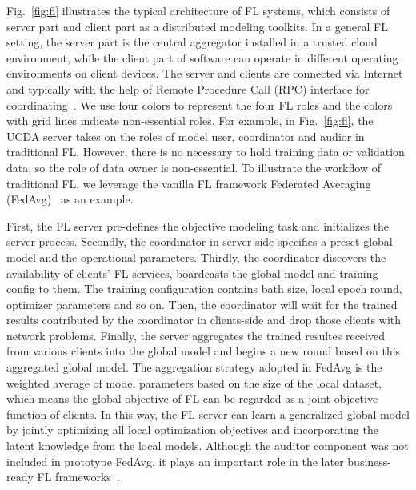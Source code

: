 Fig.~\ref{fig:fl} illustrates the typical architecture of FL systems, which consists of server part and client part as a distributed modeling toolkits. 
In a general FL setting, the server part is the central aggregator installed in a trusted cloud environment, while the client part of software can operate in different operating environments on client devices. 
The server and clients are connected via Internet and typically with the help of Remote Procedure Call (RPC) interface for coordinating~\cite{zhang2022felicitas, abadi2016tensorflow, liu2021fate, beutel2020flower, he2020fedml, foley2022openfl}.
We use four colors to represent the four FL roles and the colors with grid lines indicate non-essential roles.
For example, in Fig.~\ref{fig:fl}, the UCDA server takes on the roles of model user, coordinator and audior in traditional FL. 
However, there is no necessary to hold training data or validation data, so the role of data owner is non-essential.
To illustrate the workflow of traditional FL, we leverage the vanilla FL framework Federated Averaging (FedAvg)~\cite{mcmahan2017communication, bonawitz2019towards} as an example.

First, the FL server pre-defines the objective modeling task and initializes the server process.
Secondly,  the coordinator in server-side specifies a preset global model and the operational parameters.
Thirdly, the coordinator discovers the availability of clients' FL services, boardcasts the global model and training config to them. The training configuration contains bath size, local epoch round, optimizer parameters and so on. Then, the coordinator will wait for the trained results contributed by the coordinator in clients-side and drop those clients with network problems.
Finally, the server aggregates the trained resultes received from various clients into the global model and begins a new round based on this aggregated global model. 
The aggregation strategy adopted in FedAvg is the weighted average of model parameters based on the size of the local dataset, which means the global objective of FL can be regarded as a joint objective function of clients.
In this way, the FL server can learn a generalized global model by jointly optimizing all local optimization objectives and incorporating the latent knowledge from the local models.
Although the auditor component was not included in prototype FedAvg, it plays an important role in the later business-ready FL frameworks~\cite{liu2021fate,roth2022nvidia, ziller2021pysyft}.


